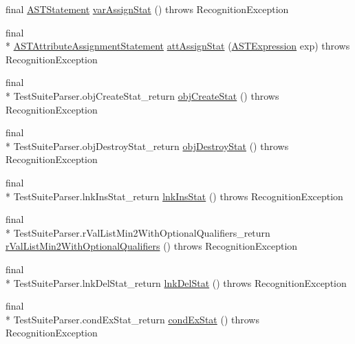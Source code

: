 \begin{DoxyCompactItemize}
\item 
final \hyperlink{classorg_1_1tzi_1_1use_1_1parser_1_1soil_1_1ast_1_1_a_s_t_statement}{A\-S\-T\-Statement} \hyperlink{classorg_1_1tzi_1_1use_1_1parser_1_1testsuite_1_1_test_suite_parser_ab47a4a5f6e70a7b4a6e623e104f98566}{var\-Assign\-Stat} ()  throws Recognition\-Exception 
\item 
final \\*
\hyperlink{classorg_1_1tzi_1_1use_1_1parser_1_1soil_1_1ast_1_1_a_s_t_attribute_assignment_statement}{A\-S\-T\-Attribute\-Assignment\-Statement} \hyperlink{classorg_1_1tzi_1_1use_1_1parser_1_1testsuite_1_1_test_suite_parser_a1f460d3e942ff26a4781e24a651ffd0a}{att\-Assign\-Stat} (\hyperlink{classorg_1_1tzi_1_1use_1_1parser_1_1ocl_1_1_a_s_t_expression}{A\-S\-T\-Expression} exp)  throws Recognition\-Exception 
\item 
final \\*
Test\-Suite\-Parser.\-obj\-Create\-Stat\-\_\-return \hyperlink{classorg_1_1tzi_1_1use_1_1parser_1_1testsuite_1_1_test_suite_parser_a989ba5876b3b14c815359af4ce2a3a4c}{obj\-Create\-Stat} ()  throws Recognition\-Exception 
\item 
final \\*
Test\-Suite\-Parser.\-obj\-Destroy\-Stat\-\_\-return \hyperlink{classorg_1_1tzi_1_1use_1_1parser_1_1testsuite_1_1_test_suite_parser_a5dc218d81082032f1bbfe02907c3064d}{obj\-Destroy\-Stat} ()  throws Recognition\-Exception 
\item 
final \\*
Test\-Suite\-Parser.\-lnk\-Ins\-Stat\-\_\-return \hyperlink{classorg_1_1tzi_1_1use_1_1parser_1_1testsuite_1_1_test_suite_parser_ae2c5d48a586dc6041444c7d9fa3928ff}{lnk\-Ins\-Stat} ()  throws Recognition\-Exception 
\item 
final \\*
Test\-Suite\-Parser.\-r\-Val\-List\-Min2\-With\-Optional\-Qualifiers\-\_\-return \hyperlink{classorg_1_1tzi_1_1use_1_1parser_1_1testsuite_1_1_test_suite_parser_aa69627e15a0a87086aa5f3168b6e7389}{r\-Val\-List\-Min2\-With\-Optional\-Qualifiers} ()  throws Recognition\-Exception 
\item 
final \\*
Test\-Suite\-Parser.\-lnk\-Del\-Stat\-\_\-return \hyperlink{classorg_1_1tzi_1_1use_1_1parser_1_1testsuite_1_1_test_suite_parser_a6a4eb3d2734a4b4aa8787ef1259c1784}{lnk\-Del\-Stat} ()  throws Recognition\-Exception 
\item 
final \\*
Test\-Suite\-Parser.\-cond\-Ex\-Stat\-\_\-return \hyperlink{classorg_1_1tzi_1_1use_1_1parser_1_1testsuite_1_1_test_suite_parser_a40ec1a6e13315ff873d3dc915e76e014}{cond\-Ex\-Stat} ()  throws Recognition\-Exception 

\end{DoxyCompactItemize}
